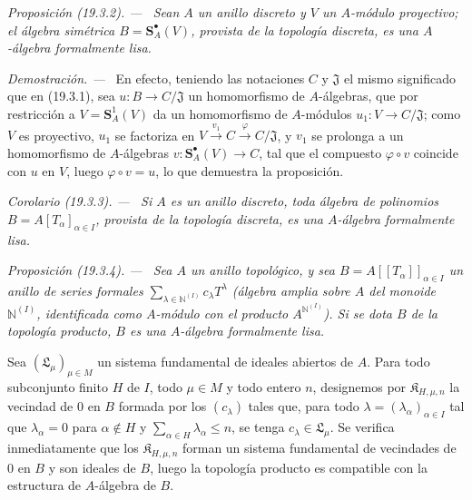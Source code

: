 \documentclass[10pt,oneside]{book}
\makeatletter
\newcommand{\setmanualcurrentlabel}[1]{\def\@currentlabel{#1}}
\newenvironment{proposition}[1][]{%
  \setmanualcurrentlabel{#1}\par\medskip\noindent\itshape Proposición (#1). ---\ }{\par}
\newenvironment{corollary}[1][]{%
  \setmanualcurrentlabel{#1}\par\medskip\noindent\itshape Corolario (#1). ---\ }{\par}
\newenvironment{proof}{%
  \par\medskip\noindent\textit{Demostración. ---\ }}{\par}
\makeatother
\begin{document}
\begin{proposition}[19.3.2]
\label{0.19.3.2-es}
Sean $A$ un anillo discreto y $V$ un $A$-módulo proyectivo; el álgebra
simétrica $B=\mathbf S_A^\bullet(V)$, provista de la topología discreta, es una
$A$-álgebra formalmente lisa.
\end{proposition}

\begin{proof}
En efecto, teniendo las notaciones $C$ y $\mathfrak J$ el mismo significado que en
(19.3.1), sea $u:B\to C/\mathfrak J$ un homomorfismo de $A$-álgebras, que
por restricción a $V=\mathbf S_A^1(V)$ da un homomorfismo de $A$-módulos
$u_1:V\to C/\mathfrak J$; como $V$ es proyectivo, $u_1$ se factoriza en
$V\xrightarrow{v_1}C\xrightarrow{\varphi}C/\mathfrak J$, y $v_1$ se
prolonga a un homomorfismo de $A$-álgebras
$v:\mathbf S_A^\bullet(V)\to C$, tal que el compuesto
$\varphi\circ v$ coincide con $u$ en $V$, luego
$\varphi\circ v=u$, lo que demuestra la proposición.
\end{proof}

\begin{corollary}[19.3.3]
\label{0.19.3.3-es}
Si $A$ es un anillo discreto, toda álgebra de polinomios
$B=A[T_\alpha]_{\alpha\in I}$, provista de la topología discreta, es una
$A$-álgebra formalmente lisa.
\end{corollary}

\begin{proposition}[19.3.4]
\label{0.19.3.4-es}
Sea $A$ un anillo topológico, y sea
$B=A[[T_\alpha]]_{\alpha\in I}$ un anillo de series formales
$\sum_{\lambda\in\mathbb{N}^{(I)}}c_\lambda T^\lambda$ (álgebra amplia sobre
$A$ del monoide $\mathbb{N}^{(I)}$, identificada como $A$-módulo con el producto
$A^{\mathbb{N}^{(I)}}$). Si se dota $B$ de la topología producto, $B$ es una
$A$-álgebra formalmente lisa.
\end{proposition}

Sea $(\mathfrak L_\mu)_{\mu\in M}$ un sistema fundamental de ideales abiertos
de $A$. Para todo subconjunto finito $H$ de $I$, todo $\mu\in M$ y todo entero
$n$, designemos por $\mathfrak K_{H,\mu,n}$ la vecindad de $0$ en $B$ formada
por los $(c_\lambda)$ tales que, para todo
$\lambda=(\lambda_\alpha)_{\alpha\in I}$ tal que
$\lambda_\alpha=0$ para $\alpha\notin H$ y
$\sum_{\alpha\in H}\lambda_\alpha\leq n$, se tenga
$c_\lambda\in\mathfrak L_\mu$. Se verifica inmediatamente que los
$\mathfrak K_{H,\mu,n}$ forman un sistema fundamental de vecindades de $0$
en $B$ y son ideales de $B$, luego la topología producto es compatible
con la estructura de $A$-álgebra de $B$.
\end{document}
